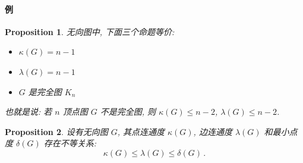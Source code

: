 \documentclass[UTF8]{ctexart}
\theoremstyle{mystyle}
\newtheorem{proposition}{Proposition}[section]
\theoremstyle{myremark}
\theoremstyle{plain}
\begin{document}
\paragraph{例}



\begin{proposition}
    无向图中, 下面三个命题等价:
    \begin{itemize}
        \item $ \kappa(G) = n - 1 $
        \item $ \lambda(G) = n - 1 $
        \item $ G $ 是完全图 $ K_n $
    \end{itemize}
    也就是说: 若 $ n $ 顶点图 $ G $ 不是完全图, 则 $ \kappa(G) \leqslant n - 2 $, $ \lambda(G) \leqslant n - 2 $.
\end{proposition}

\begin{proposition}
    设有无向图 $ G $, 其点连通度 $ \kappa(G) $, 边连通度 $ \lambda(G) $ 和最小点度 $ \delta(G) $ 存在不等关系:
    \[ \kappa(G) \leqslant \lambda(G) \leqslant \delta(G) \,.\]
\end{proposition}
\end{document}
